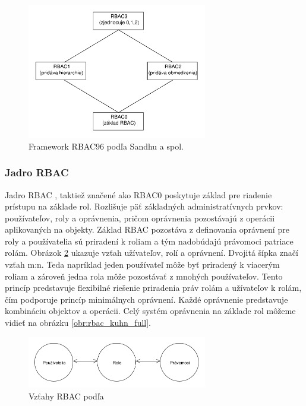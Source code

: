 \begin{figure}[h]
	\centerline{\includegraphics[width=0.7\textwidth]{images/rbac012}}
	\caption{Framework RBAC96 podľa Sandhu a spol.}
	\label{obr:roly_rbac0_rbac1_...}
\end{figure}



\subsubsection{Jadro RBAC}
Jadro RBAC , taktiež značené ako RBAC0 poskytuje základ pre riadenie prístupu na základe rol. Rozlišuje päť základných administratívnych prvkov: používateľov, roly a oprávnenia, pričom oprávnenia pozostávajú z operácii aplikovaných na objekty. Základ RBAC pozostáva z definovania oprávnení pre roly a používatelia sú priradení k roliam a tým nadobúdajú právomoci patriace rolám. Obrázok \ref{obr:rbac_kuhn} ukazuje vzťah užívateľov, rolí a oprávnení. Dvojitá šípka značí vzťah m:n. Teda napríklad jeden používateľ môže byť priradený k viacerým roliam a zároveň jedna rola môže pozostávať z mnohých používateľov. Tento princíp predstavuje flexibilné riešenie priradenia práv rolám a užívateľov k rolám, čím podporuje princíp minimálnych oprávnení. Každé oprávnenie predstavuje kombináciu objektov a operácii. Celý systém oprávnenia na základe rol môžeme vidieť na obrázku \ref{obr:rbac_kuhn_full}.

\begin{figure}[h]
	\centerline{\includegraphics[width=0.7\textwidth]{images/rbac_kuhn}}
	\caption{Vzťahy RBAC podľa \cite{kuhn}}
	\label{obr:rbac_kuhn}
\end{figure}

